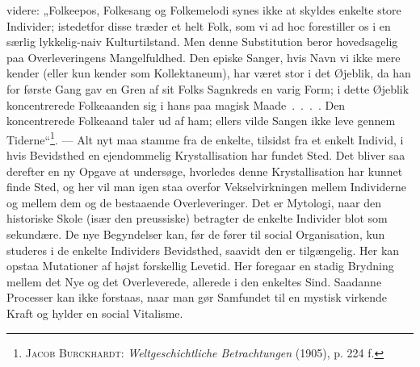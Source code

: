 \documentclass[12pt]{article}
\begin{document}
videre: „Folkeepos, Folkesang og Folkemelodi synes ikke at skyldes enkelte store
Individer; istedetfor disse træder et helt Folk, som vi ad hoc forestiller os i en
særlig lykkelig-naiv Kulturtilstand. Men denne Substitution beror hovedsagelig
paa Overleveringens Mangelfuldhed. Den episke Sanger, hvis Navn vi ikke mere
kender (eller kun kender som Kollektaneum), har været stor i det Øjeblik, da han
for første Gang gav en Gren af sit Folks Sagnkreds en varig Form; i dette Øjeblik
koncentrerede Folkeaanden sig i hans paa magisk Maade~.~.~.~. Den koncentrerede
Folkeaand taler ud af ham; ellers vilde Sangen ikke leve gennem
Tiderne“\footnote{\textsc{Jacob Burckhardt}: \textit{Weltgeschichtliche
Betrachtungen} (1905), p. 224 f.}. --- Alt nyt maa stamme fra de enkelte, tilsidst
fra et enkelt Individ, i hvis Bevidsthed en ejendommelig Krystallisation har
fundet Sted. Det bliver saa derefter en ny Opgave at undersøge, hvorledes denne
Krystallisation har kunnet finde Sted, og her vil man igen staa overfor
Vekselvirkningen mellem Individerne og mellem dem og de bestaaende Overleveringer.
Det er Mytologi, naar den historiske Skole (især den preussiske) betragter de
enkelte Individer blot som sekundære. De nye Begyndelser kan, før de fører til
social Organisation, kun studeres i de enkelte Individers Bevidsthed, saavidt den
er tilgængelig. Her kan opstaa Mutationer af højst forskellig Levetid. Her
foregaar en stadig Brydning mellem det Nye og det Overleverede, allerede i den
enkeltes Sind. Saadanne Processer kan ikke forstaas, naar man gør Samfundet til en
mystisk virkende Kraft og hylder en social Vitalisme.
\end{document}
